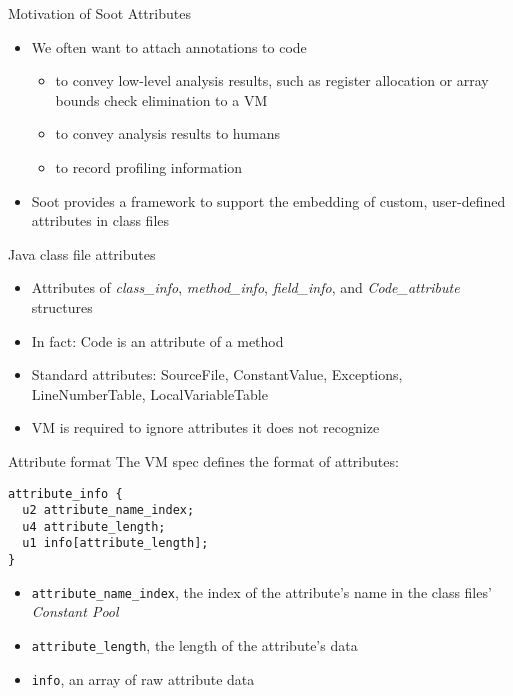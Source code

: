 
\begin{slide}{Motivation of Soot Attributes}
\begin{itemize}
\item We often want to attach annotations to code
\begin{itemize}
\item to convey low-level analysis results, such as register allocation or
      array bounds check elimination to a VM
\item to convey analysis results to humans
\item to record profiling information
\end{itemize}
\item Soot provides a framework to support the embedding of custom, 
      user-defined attributes in class files
\end{itemize}
\end{slide}

\begin{slide}{Java class file attributes}
\begin{itemize}
\item Attributes of {\em class\_info}, {\em method\_info}, 
      {\em field\_info}, and {\em Code\_attribute} structures
\item In fact: Code is an attribute of a method
\item Standard attributes: SourceFile, ConstantValue, Exceptions,
      LineNumberTable, LocalVariableTable
\item VM is required to ignore attributes it does not recognize
\end{itemize}
\end{slide}

\begin{slide}{Attribute format}
The VM spec defines the format of attributes:
\small{
\begin{verbatim}
attribute_info {
  u2 attribute_name_index;
  u4 attribute_length;
  u1 info[attribute_length];
}
\end{verbatim}
}
\begin{itemize}
\item {\tt attribute\_name\_index}, the index of the attribute's name in the class files' {\em Constant Pool}
\item {\tt attribute\_length}, the length of the attribute's data
\item {\tt info}, an array of raw attribute data
\end{itemize}
\end{slide}

